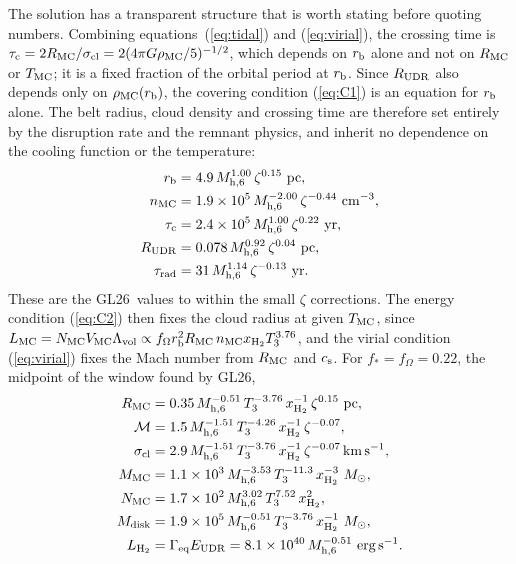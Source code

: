 \documentclass[twocolumn,pdftex]{aastex701}
\newcommand{\msun}{M_{\odot}}
\newcommand{\mhsix}{M_{\rm h,6}}
\newcommand{\Tthree}{T_{3}}
\newcommand{\xhh}{x_{\rm H_2}}
\newcommand{\fst}{f_{\ast}}
\newcommand{\fOm}{f_{\Omega}}
\newcommand{\Geq}{\Gamma_{\rm eq}}
\newcommand{\GL}{GL26}
\newcommand{\kms}{\,{\rm km\,s^{-1}}}
\newcommand{\Htwo}{{\rm H_2}}
\begin{document}
The solution has a transparent structure that is worth stating before quoting numbers. Combining equations~(\ref{eq:tidal}) and (\ref{eq:virial}), the crossing time is $\tau_{\rm c} = 2R_{\rm MC}/\sigma_{\rm cl} = 2(4\pi G\rho_{\rm MC}/5)^{-1/2}$, which depends on $r_{\rm b}$ alone and not on $R_{\rm MC}$ or $T_{\rm MC}$; it is a fixed fraction of the orbital period at $r_{\rm b}$. Since $R_{\rm UDR}$ also depends only on $\rho_{\rm MC}(r_{\rm b})$, the covering condition (\ref{eq:C1}) is an equation for $r_{\rm b}$ alone. The belt radius, cloud density and crossing time are therefore set entirely by the disruption rate and the remnant physics, and inherit no dependence on the cooling function or the temperature:
\begin{align}
r_{\rm b} &= 4.9\,\mhsix^{1.00}\,\zeta^{0.15}\ {\rm pc}, \label{eq:rb}\\
n_{\rm MC} &= 1.9\times10^{5}\,\mhsix^{-2.00}\,\zeta^{-0.44}\ {\rm cm^{-3}}, \label{eq:nMC}\\
\tau_{\rm c} &= 2.4\times10^{5}\,\mhsix^{1.00}\,\zeta^{0.22}\ {\rm yr}, \label{eq:tc}\\
R_{\rm UDR} &= 0.078\,\mhsix^{0.92}\,\zeta^{0.04}\ {\rm pc}, \label{eq:Rudr}\\
\tau_{\rm rad} &= 31\,\mhsix^{1.14}\,\zeta^{-0.13}\ {\rm yr}. \label{eq:trad2}
\end{align}
These are the \GL\ values to within the small $\zeta$ corrections. The energy condition (\ref{eq:C2}) then fixes the cloud radius at given $T_{\rm MC}$, since $L_{\rm MC} = N_{\rm MC}V_{\rm MC}\Lambda_{\rm vol}\propto\fOm r_{\rm b}^{2}R_{\rm MC}\,n_{\rm MC}\xhh\Tthree^{3.76}$, and the virial condition (\ref{eq:virial}) fixes the Mach number from $R_{\rm MC}$ and $c_{\rm s}$. For $\fst=\fOm=0.22$, the midpoint of the window found by \GL,
\begin{align}
R_{\rm MC} &= 0.35\,\mhsix^{-0.51}\,\Tthree^{-3.76}\,\xhh^{-1}\,\zeta^{0.15}\ {\rm pc}, \label{eq:RMC}\\
\mathcal{M} &= 1.5\,\mhsix^{-1.51}\,\Tthree^{-4.26}\,\xhh^{-1}\,\zeta^{-0.07}, \label{eq:Mach}\\
\sigma_{\rm cl} &= 2.9\,\mhsix^{-1.51}\,\Tthree^{-3.76}\,\xhh^{-1}\,\zeta^{-0.07}\kms, \label{eq:sigcl}\\
M_{\rm MC} &= 1.1\times10^{3}\,\mhsix^{-3.53}\,\Tthree^{-11.3}\,\xhh^{-3}\ \msun, \label{eq:MMC}\\
N_{\rm MC} &= 1.7\times10^{2}\,\mhsix^{3.02}\,\Tthree^{7.52}\,\xhh^{2}, \label{eq:NMC}\\
M_{\rm disk} &= 1.9\times10^{5}\,\mhsix^{-0.51}\,\Tthree^{-3.76}\,\xhh^{-1}\ \msun, \label{eq:Mdisk}\\
L_{\Htwo} &= \Geq E_{\rm UDR} = 8.1\times10^{40}\,\mhsix^{-0.51}\ {\rm erg\,s^{-1}}. \label{eq:LH2}
\end{align}
\end{document}
